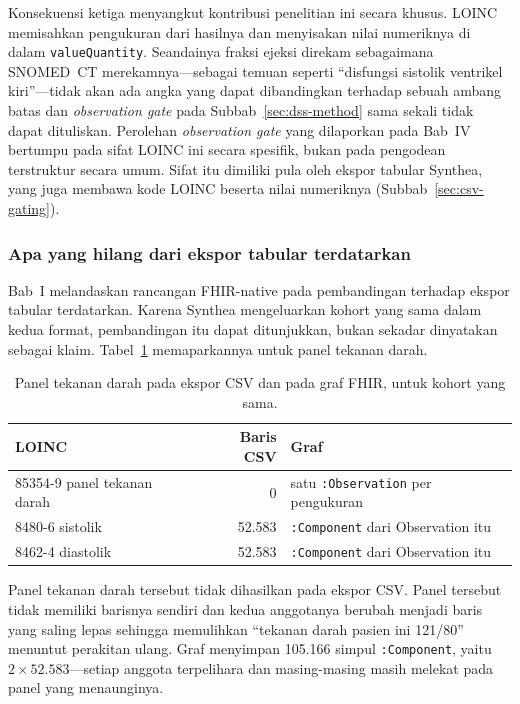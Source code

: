 Konsekuensi ketiga menyangkut kontribusi penelitian ini secara khusus. LOINC memisahkan
pengukuran dari hasilnya dan menyisakan nilai numeriknya di dalam \texttt{valueQuantity}.
Seandainya fraksi ejeksi direkam sebagaimana SNOMED~CT merekamnya---sebagai temuan seperti
``disfungsi sistolik ventrikel kiri''---tidak akan ada angka yang dapat dibandingkan terhadap
sebuah ambang batas dan \emph{observation gate} pada Subbab~\ref{sec:dss-method} sama sekali tidak
dapat dituliskan. Perolehan \emph{observation gate} yang dilaporkan pada Bab~IV bertumpu pada
sifat LOINC ini secara spesifik, bukan pada pengodean terstruktur secara umum. Sifat itu
dimiliki pula oleh ekspor tabular Synthea, yang juga membawa kode LOINC beserta nilai
numeriknya (Subbab~\ref{sec:csv-gating}).

\subsubsection*{Apa yang hilang dari ekspor tabular terdatarkan}
\label{sec:flattening}
Bab~I melandaskan rancangan FHIR-native pada pembandingan terhadap ekspor tabular terdatarkan.
Karena Synthea mengeluarkan kohort yang sama dalam kedua format, pembandingan itu dapat
ditunjukkan, bukan sekadar dinyatakan sebagai klaim. Tabel~\ref{tab:flattening} memaparkannya untuk panel
tekanan darah.

\begin{table}[h]
\centering
\caption{Panel tekanan darah pada ekspor CSV dan pada graf FHIR, untuk kohort yang sama.}
\label{tab:flattening}
\begin{tabular}{lrl}
\hline
\textbf{LOINC} & \textbf{Baris CSV} & \textbf{Graf} \\
\hline
85354-9 panel tekanan darah & 0      & satu \texttt{:Observation} per pengukuran \\
8480-6 sistolik             & 52.583 & \texttt{:Component} dari Observation itu \\
8462-4 diastolik            & 52.583 & \texttt{:Component} dari Observation itu \\
\hline
\end{tabular}
\end{table}

Panel tekanan darah tersebut tidak dihasilkan pada ekspor CSV. Panel tersebut tidak memiliki
barisnya sendiri dan kedua anggotanya berubah menjadi baris yang saling lepas sehingga
memulihkan ``tekanan darah pasien ini 121/80'' menuntut perakitan ulang. Graf menyimpan
105.166 simpul \texttt{:Component}, yaitu $2 \times 52.583$---setiap anggota
terpelihara dan masing-masing masih melekat pada panel yang menaunginya.

